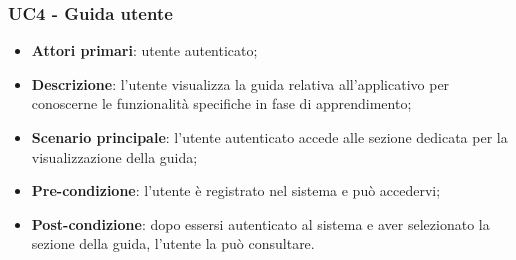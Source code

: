 \subsubsection{UC4 - Guida utente}
\begin{itemize}
	\item \textbf{Attori primari}: utente autenticato;
	\item \textbf{Descrizione}: l'utente visualizza la guida relativa all'applicativo per conoscerne le funzionalità specifiche in fase di apprendimento;
	\item \textbf{Scenario principale}: l'utente autenticato accede alle sezione dedicata per la visualizzazione della guida;
	\item \textbf{Pre-condizione}: l'utente è registrato nel sistema e può accedervi;
	\item \textbf{Post-condizione}: dopo essersi autenticato al sistema e aver selezionato la sezione della guida, l'utente la può consultare.
\end{itemize}   